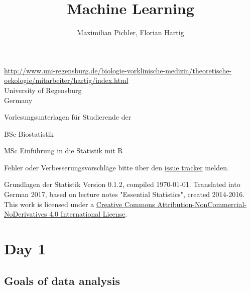 \documentclass[a4paper,twoside]{tufte-book}\usepackage[]{graphicx}\usepackage[]{color}
\title{Machine Learning}
\author{Maximilian Pichler, Florian Hartig}
\begin{document}

\let\cleardoublepage\clearpage %
\maketitle


\thispagestyle{empty}
\null


\href{Prof. Dr. Florian Hartig}{http://www.uni-regensburg.de/biologie-vorklinische-medizin/theoretische-oekologie/mitarbeiter/hartig/index.html}\\
University of Regensburg\\
Germany\\[0.5cm]

\begin{fullwidth}
Vorlesungsunterlagen für Studierende der

\begin{itemize*}
  \item BSc Biostatistik
  \item MSc Einführung in die Statistik mit R
\end{itemize*}

\vspace{0.5cm}

Fehler oder Verbesserungsvorschläge bitte über den \href{https://github.com/TheoreticalEcology/machinelearning/issues}{issue tracker} melden. 

\end{fullwidth}


\vfill
\begin{fullwidth}
Grundlagen der Statistik Version 0.1.2, compiled \today. Translated into German 2017, based on lecture notes "Essential Statistics", created 2014-2016. This work is licensed under a \href{https://creativecommons.org/licenses/by-nc-nd/4.0/}{Creative Commons Attribution-NonCommercial-NoDerivatives 4.0 International License}. 
\end{fullwidth}


\newpage
\tableofcontents

\chapter{Day 1} %

\section{Goals of data analysis}
\end{document}

